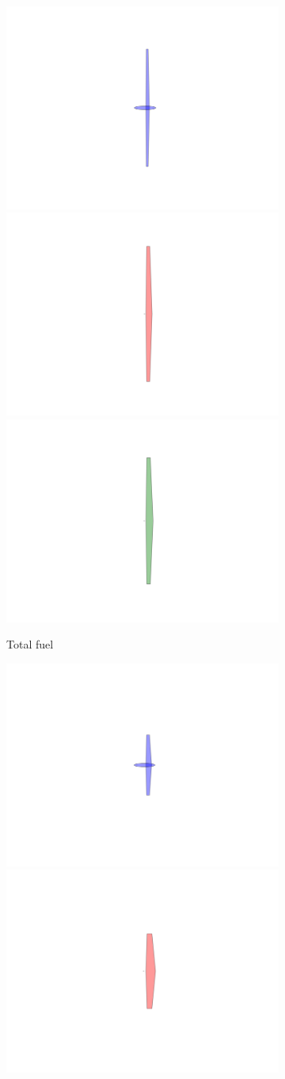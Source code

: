 \begin{figure}
    \begin{center}
        \begin{subfigure}{0.48\linewidth}
            \includegraphics[trim={8cm 1cm 8cm 1cm}, clip, width=0.33\linewidth]{figures/0nominal.png}\hfill
            \includegraphics[trim={8cm 1cm 8cm 1cm}, clip, width=0.33\linewidth]{figures/0elliptical.png}\hfill
            \includegraphics[trim={8cm 1cm 8cm 1cm}, clip, width=0.33\linewidth]{figures/0box.png}\hfill
            \caption{Total fuel}
        \end{subfigure}
        \begin{subfigure}{0.48\linewidth}
            \includegraphics[trim={8cm 1cm 8cm 1cm}, clip, width=0.33\linewidth]{figures/1nominal.png}\hfill
            \includegraphics[trim={8cm 1cm 8cm 1cm}, clip, width=0.33\linewidth]{figures/1elliptical.png}\hfill

\end{subfigure}
\end{center}
\end{figure}
